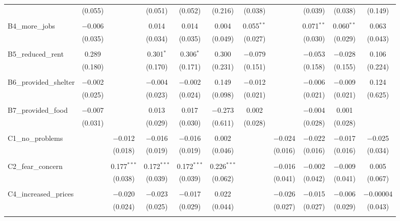 \begin{table}[H]
\begin{tabular}{@{\extracolsep{4pt}}lcccccccccc}
  & (0.055) &  & (0.051) & (0.052) & (0.216) & (0.038) &  & (0.039) & (0.038) & (0.149) \\ 
  & & & & & & & & & & \\ 
 B4\_more\_jobs & $-$0.006 &  & 0.014 & 0.014 & 0.004 & 0.055$^{**}$ &  & 0.071$^{**}$ & 0.060$^{**}$ & 0.063 \\ 
  & (0.035) &  & (0.034) & (0.035) & (0.049) & (0.027) &  & (0.030) & (0.029) & (0.043) \\ 
  & & & & & & & & & & \\ 
 B5\_reduced\_rent & 0.289 &  & 0.301$^{*}$ & 0.306$^{*}$ & 0.300 & $-$0.079 &  & $-$0.053 & $-$0.028 & 0.106 \\ 
  & (0.180) &  & (0.170) & (0.171) & (0.231) & (0.151) &  & (0.158) & (0.155) & (0.224) \\ 
  & & & & & & & & & & \\ 
 B6\_provided\_shelter & $-$0.002 &  & $-$0.004 & $-$0.002 & 0.149 & $-$0.012 &  & $-$0.006 & $-$0.009 & 0.124 \\ 
  & (0.025) &  & (0.023) & (0.024) & (0.098) & (0.021) &  & (0.021) & (0.021) & (0.625) \\ 
  & & & & & & & & & & \\ 
 B7\_provided\_food & $-$0.007 &  & 0.013 & 0.017 & $-$0.273 & 0.002 &  & $-$0.004 & 0.001 &  \\ 
  & (0.031) &  & (0.029) & (0.030) & (0.611) & (0.028) &  & (0.028) & (0.028) &  \\ 
  & & & & & & & & & & \\ 
 C1\_no\_problems &  & $-$0.012 & $-$0.016 & $-$0.016 & 0.002 &  & $-$0.024 & $-$0.022 & $-$0.017 & $-$0.025 \\ 
  &  & (0.018) & (0.019) & (0.019) & (0.046) &  & (0.016) & (0.016) & (0.016) & (0.034) \\ 
  & & & & & & & & & & \\ 
 C2\_fear\_concern &  & 0.177$^{***}$ & 0.172$^{***}$ & 0.172$^{***}$ & 0.226$^{***}$ &  & $-$0.016 & $-$0.002 & $-$0.009 & 0.005 \\ 
  &  & (0.038) & (0.039) & (0.039) & (0.062) &  & (0.041) & (0.042) & (0.041) & (0.067) \\ 
  & & & & & & & & & & \\ 
 C4\_increased\_prices &  & $-$0.020 & $-$0.023 & $-$0.017 & 0.022 &  & $-$0.026 & $-$0.015 & $-$0.006 & $-$0.00004 \\ 
  &  & (0.024) & (0.025) & (0.029) & (0.044) &  & (0.027) & (0.027) & (0.029) & (0.043) \\ 
  & & & & & & & & & & \\ 

\end{tabular}
\end{table}
